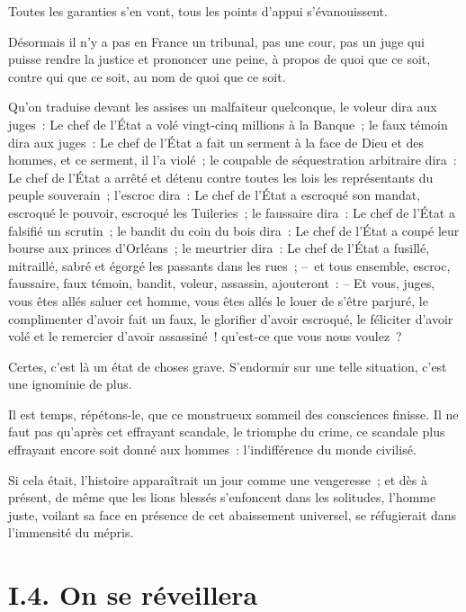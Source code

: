 \documentclass[french,twoside]{book} %
\begin{document}
Toutes les garanties s’en vont, tous les points d’appui s’évanouissent.\par
Désormais il n’y a pas en France un tribunal, pas une cour, pas un juge qui puisse rendre la justice et prononcer une peine, à propos de quoi que ce soit, contre qui que ce soit, au nom de quoi que ce soit.\par
Qu’on traduise devant les assises un malfaiteur quelconque, le voleur dira aux juges : Le chef de l’État a volé vingt-cinq millions à la Banque ; le faux témoin dira aux juges : Le chef de l’État a fait un serment à la face de Dieu et des hommes, et ce serment, il l’a violé ; le coupable de séquestration arbitraire dira : Le chef de l’État a arrêté et détenu contre toutes les lois les représentants du peuple souverain ; l’escroc dira : Le chef de l’État a escroqué son mandat, escroqué le pouvoir, escroqué les Tuileries ; le faussaire dira : Le chef de l’État a falsifié un scrutin ; le bandit du coin du bois dira : Le chef de l’État a coupé leur bourse aux princes d’Orléans ; le meurtrier dira : Le chef de l’État a fusillé, mitraillé, sabré et égorgé les passants dans les rues ; – et tous ensemble, escroc, faussaire, faux témoin, bandit, voleur, assassin, ajouteront : – Et vous, juges, vous êtes allés saluer cet homme, vous êtes allés le louer de s’être parjuré, le complimenter d’avoir fait un faux, le glorifier d’avoir escroqué, le féliciter d’avoir volé et le remercier d’avoir assassiné ! qu’est-ce que vous nous voulez ?\par
Certes, c’est là un état de choses grave. S’endormir sur une telle situation, c’est une ignominie de plus.\par
Il est temps, répétons-le, que ce monstrueux sommeil des consciences finisse. Il ne faut pas qu’après cet effrayant scandale, le triomphe du crime, ce scandale plus effrayant encore soit donné aux hommes : l’indifférence du monde civilisé.\par
Si cela était, l’histoire apparaîtrait un jour comme une vengeresse ; et dès à présent, de même que les lions blessés s’enfoncent dans les solitudes, l’homme juste, voilant sa face en présence de cet abaissement universel, se réfugierait dans l’immensité du mépris.

\section[{I.4. On se réveillera}]{I.4. On se réveillera}
\end{document}
